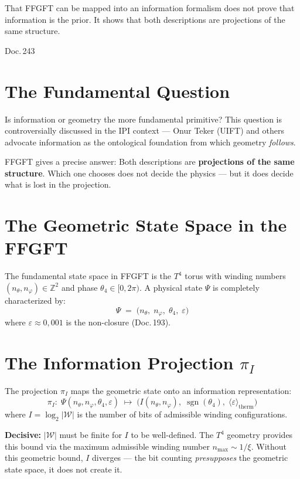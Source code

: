 \label{ch:geometrie_vs_info}

\epigraph{That FFGFT can be mapped into an information formalism
does not prove that information is the prior. It shows that both
descriptions are projections of the same structure.}{Doc.\,243}

\section{The Fundamental Question}

Is information or geometry the more fundamental primitive? This question is
controversially discussed in the IPI context --- Onur Teker (UIFT) and others advocate
information as the ontological foundation from which geometry \emph{follows}.

FFGFT gives a precise answer: Both descriptions are
\textbf{projections of the same structure}. Which one chooses does not decide
the physics --- but it does decide what is lost in the projection.

\section{The Geometric State Space in the FFGFT}

The fundamental state space in FFGFT is the $T^4$ torus with
winding numbers $(n_\theta, n_\varphi) \in \mathbb{Z}^2$ and phase
$\theta_4 \in [0, 2\pi)$. A physical state $\Psi$ is
completely characterized by:
\[
  \Psi \;=\; \bigl(n_\theta,\; n_\varphi,\; \theta_4,\; \varepsilon\bigr)
\]
where $\varepsilon \approx 0{,}001$ is the non-closure (Doc.\,193).

\section{The Information Projection \texorpdfstring{$\pi_I$}{pi\_I}}

The projection $\pi_I$ maps the geometric state onto an
information representation:
\[
  \pi_I:\; \Psi(n_\theta, n_\varphi, \theta_4, \varepsilon)
  \;\longmapsto\;
  \bigl(I(n_\theta, n_\varphi),\;\operatorname{sgn}(\theta_4),\;
        \langle\varepsilon\rangle_\text{therm}\bigr)
\]
where $I = \log_2|\mathcal{W}|$ is the number of bits of admissible
winding configurations.

\textbf{Decisive:} $|\mathcal{W}|$ must be finite for $I$
to be well-defined. The $T^4$ geometry provides this bound via the maximum
admissible winding number $n_\text{max} \sim 1/\xi$. Without this geometric
bound, $I$ diverges --- the bit counting \emph{presupposes} the geometric
state space, it does not create it.

